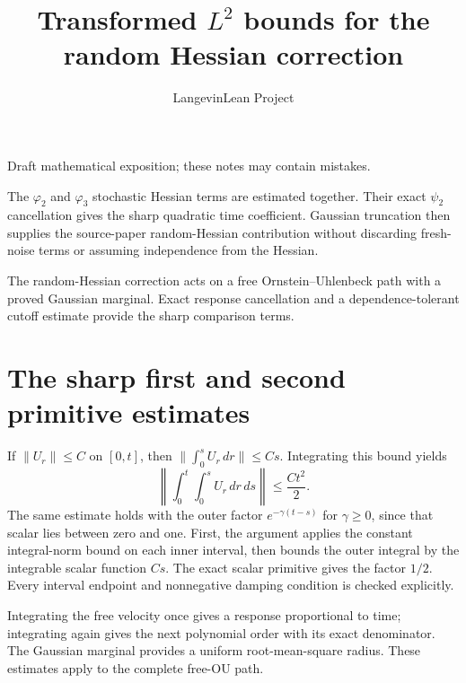 \documentclass[11pt,a4paper]{article}
\title{\texorpdfstring{Transformed \(L^{2}\) bounds for the random Hessian correction}{Transformed L² bounds for the random Hessian correction}}
\author{LangevinLean Project}
\date{}
\begin{document}
\maketitle
Draft mathematical exposition; these notes may contain mistakes.


The \(\varphi _{2}\) and \(\varphi _{3}\) stochastic Hessian terms are estimated together. Their exact \(\psi _{2}\) cancellation gives the sharp quadratic time coefficient. Gaussian truncation then supplies the source-paper random-Hessian contribution without discarding fresh-noise terms or assuming independence from the Hessian.



The random-Hessian correction acts on a free Ornstein–Uhlenbeck path with a proved Gaussian marginal. Exact response cancellation and a dependence-tolerant cutoff estimate provide the sharp comparison terms.


\section{\texorpdfstring{The sharp first and second primitive estimates}{The sharp first and second primitive estimates}}


If \(\|U_r\|\le C\) on \([0,t]\), then \(\|\int_0^sU_r\,dr\|\le Cs\). Integrating this bound yields \[\left\|\int_0^t\int_0^sU_r\,dr\,ds\right\|\le\frac{Ct^2}{2}.\] The same estimate holds with the outer factor \(e^{-\gamma(t-s)}\) for \(\gamma\ge0\), since that scalar lies between zero and one. First, the argument applies the constant integral-norm bound on each inner interval, then bounds the outer integral by the integrable scalar function \(Cs\). The exact scalar primitive gives the factor \(1/2\). Every interval endpoint and nonnegative damping condition is checked explicitly.



Integrating the free velocity once gives a response proportional to time; integrating again gives the next polynomial order with its exact denominator. The Gaussian marginal provides a uniform root-mean-square radius. These estimates apply to the complete free-OU path.
\end{document}
